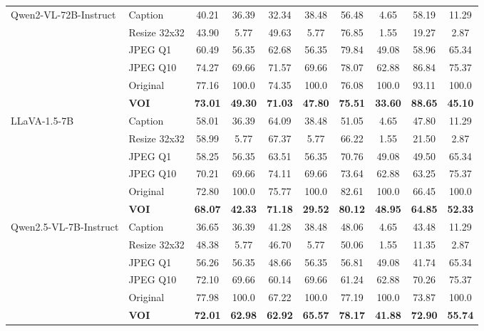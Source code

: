 \begin{table}[p]
{\begin{tabular}{llcccccccc}
\multirow{6}{*}{Qwen2-VL-72B-Instruct}
& Caption        & 40.21 & 36.39 & 32.34 & 38.48 & 56.48 & 4.65 & 58.19 & 11.29 \\
& Resize 32x32   & 43.90 & 5.77  & 49.63 & 5.77  & 76.85 & 1.55  & 19.27 & 2.87 \\
& JPEG Q1        & 60.49 & 56.35 & 62.68 & 56.35 & 79.84 & 49.08 & 58.96 & 65.34 \\
& JPEG Q10       & 74.27 & 69.66 & 71.57 & 69.66 & 78.07 & 62.88 & 86.84 & 75.37 \\
& Original       & 77.16 & 100.0 & 74.35 & 100.0 & 76.08 & 100.0 & 93.11 & 100.0 \\
& \textbf{VOI}   & \textbf{73.01} & \textbf{49.30} & \textbf{71.03} & \textbf{47.80} & \textbf{75.51} & \textbf{33.60} & \textbf{88.65} & \textbf{45.10} \\
\midrule

\multirow{6}{*}{LLaVA-1.5-7B}
& Caption        & 58.01 & 36.39 & 64.09 & 38.48 & 51.05 & 4.65 & 47.80 & 11.29 \\
& Resize 32x32   & 58.99 & 5.77  & 67.37 & 5.77  & 66.22 & 1.55  & 21.50 & 2.87 \\
& JPEG Q1        & 58.25 & 56.35 & 63.51 & 56.35 & 70.76 & 49.08 & 49.50 & 65.34 \\
& JPEG Q10       & 70.21 & 69.66 & 74.11 & 69.66 & 73.64 & 62.88 & 63.25 & 75.37 \\
& Original       & 72.80 & 100.0 & 75.77 & 100.0 & 82.61 & 100.0 & 66.45 & 100.0 \\
& \textbf{VOI}   & \textbf{68.07} & \textbf{42.33} & \textbf{71.18} & \textbf{29.52} & \textbf{80.12} & \textbf{48.95} & \textbf{64.85} & \textbf{52.33} \\
\midrule

\multirow{6}{*}{Qwen2.5-VL-7B-Instruct}
& Caption        & 36.65 & 36.39 & 41.28 & 38.48 & 48.06 & 4.65 & 43.48 & 11.29 \\
& Resize 32x32   & 48.38 & 5.77  & 46.70 & 5.77  & 50.06 & 1.55  & 11.35 & 2.87 \\
& JPEG Q1        & 56.26 & 56.35 & 48.66 & 56.35 & 56.81 & 49.08 & 41.74 & 65.34 \\
& JPEG Q10       & 72.10 & 69.66 & 60.14 & 69.66 & 61.24 & 62.88 & 70.26 & 75.37 \\
& Original       & 77.98 & 100.0 & 67.22 & 100.0 & 77.19 & 100.0 & 73.87 & 100.0 \\
& \textbf{VOI}   & \textbf{72.01} & \textbf{62.98} & \textbf{62.92} & \textbf{65.57} & \textbf{78.17} & \textbf{41.88} & \textbf{72.90} & \textbf{55.74} \\
\midrule


\end{tabular}}
\end{table}
